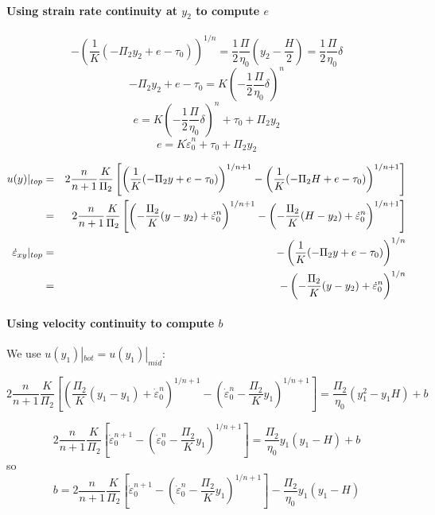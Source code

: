 \paragraph{Using strain rate continuity at $y_2$ to compute $e$}
\[
-\left( \frac{1}{K} ( -\Pi_2 y_2 +e -\tau_0 ) \right)^{1/n}
= \frac{1}{2} \frac{\Pi}{\eta_0} \left(y_2  -\frac{H}{2} \right)
= \frac{1}{2} \frac{\Pi}{\eta_0} \delta  
\]
\[
-\Pi_2 y_2 +e -\tau_0 
= K\left(-\frac{1}{2} \frac{\Pi}{\eta_0} \delta  \right)^{n} 
\]
\[
e = K\left(-\frac{1}{2} \frac{\Pi}{\eta_0} \delta  \right)^{n} + \tau_0 + \Pi_2 y_2 
\]
\[
\boxed{
e = K \dot{\varepsilon}_0^n + \tau_0 + \Pi_2 y_2 
}
\]

\begin{eqnarray}
u(y)|_{top} &=& 2 \frac{n}{n+1} \frac{K}{\Pi_2}
\left[
\left( \frac{1}{K} ( -\Pi_2 y +e -\tau_0 ) \right)^{1/n+ 1 } - 
\left( \frac{1}{K} ( -\Pi_2 H +e -\tau_0 ) \right)^{1/n+ 1 } \right] \nonumber\\
&=& 2 \frac{n}{n+1} \frac{K}{\Pi_2}
\left[
\left( -\frac{\Pi_2}{K}(y-y_2)+ \dot{\varepsilon}_0^{n}  \right)^{1/n+ 1 } - 
\left( -\frac{\Pi_2}{K}(H-y_2)+ \dot{\varepsilon}_0^{n}  \right)^{1/n+ 1 } 
\right]
\nonumber\\
\dot{\varepsilon}_{xy}|_{top}
&=&  - \left( \frac{1}{K} (- \Pi_2 y +e - \tau_0 ) \right)^{1/n} \nonumber\\
&=&  - \left( - \frac{\Pi_2}{K} (y-y_2) +  \dot{\varepsilon}_0^{n} \right)^{1/n} \nonumber
\end{eqnarray}

\paragraph{Using velocity continuity to compute $b$} 
We use $u(y_1)|_{bot}=u(y_1)|_{mid}$: 

\[
2 \frac{n}{n+1} \frac{K}{\Pi_2} \left[ \left( \frac{\Pi_2}{K} (y_1-y_1) 
+ \dot{\varepsilon}_0^{n}    \right)^{1/n+ 1 } 
- \left( \dot{\varepsilon}_0^{n}  - \frac{\Pi_2}{K}y_1     \right)^{1/n+ 1 } \right]
=
\frac{\Pi_2}{\eta_0} (y_1^2  -  y_1 H) + b
\]

\[
2 \frac{n}{n+1} \frac{K}{\Pi_2} \left[ 
\dot{\varepsilon}_0^{n+ 1} 
- \left( \dot{\varepsilon}_0^{n}  - \frac{\Pi_2}{K}y_1  \right)^{1/n+ 1 } \right]
=
\frac{\Pi_2}{\eta_0} y_1 (y_1  - H) + b
\]
so 
\[
b= 
2 \frac{n}{n+1} \frac{K}{\Pi_2} \left[ 
\dot{\varepsilon}_0^{n+ 1} 
- \left( \dot{\varepsilon}_0^{n}  - \frac{\Pi_2}{K}y_1  \right)^{1/n+ 1 } \right]
- \frac{\Pi_2}{\eta_0} y_1 (y_1  - H) 
\]


